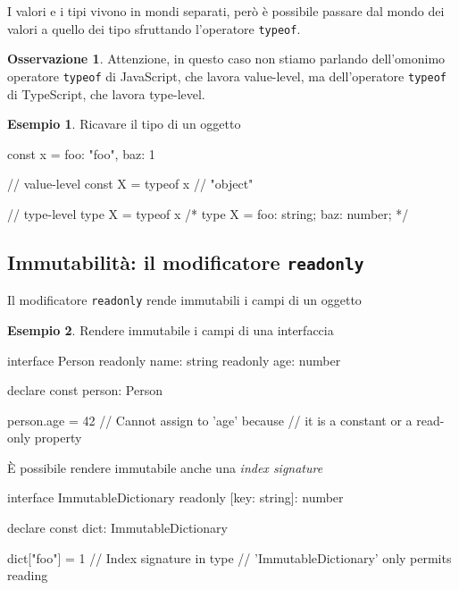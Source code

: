 \documentclass[12pt]{article}
\theoremstyle{definition}
\newtheorem{example}{Esempio}[subsection]
\newtheorem{observation}{Osservazione}[subsection]
\newenvironment{code}
  {\vspace{0.5cm} \VerbatimEnvironment\begin{typescriptcode}}
  {\end{typescriptcode} \vspace{0.2cm}}
\begin{document}
I valori e i tipi vivono in mondi separati, però è possibile passare dal mondo dei valori a quello dei tipo
sfruttando l'operatore \texttt{typeof}.

\begin{observation}
Attenzione, in questo caso non stiamo parlando dell'omonimo operatore \texttt{typeof} di JavaScript, che lavora value-level, ma
dell'operatore \texttt{typeof} di TypeScript, che lavora type-level.
\end{observation}

\begin{example}
Ricavare il tipo di un oggetto

\begin{code}
const x = {
  foo: "foo",
  baz: 1
}

// value-level
const X = typeof x
// "object"

// type-level
type X = typeof x
/*
type X = {
  foo: string;
  baz: number;
}
*/
\end{code}
\end{example}

\subsection{Immutabilità: il modificatore \texttt{readonly}}

Il modificatore \texttt{readonly} rende immutabili i campi di un oggetto

\begin{example}
Rendere immutabile i campi di una interfaccia

\begin{code}
interface Person {
  readonly name: string
  readonly age: number
}

declare const person: Person

person.age = 42 // Cannot assign to 'age' because
// it is a constant or a read-only property
\end{code}
\end{example}

È possibile rendere immutabile anche una \emph{index signature}

\begin{code}
interface ImmutableDictionary {
  readonly [key: string]: number
}

declare const dict: ImmutableDictionary

dict["foo"] = 1 // Index signature in type
// 'ImmutableDictionary' only permits reading
\end{code}
\end{document}

